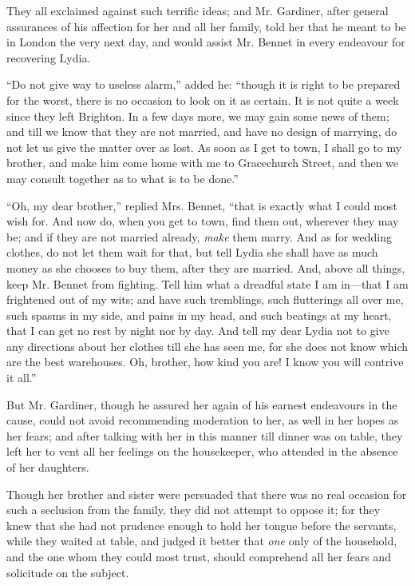 They all exclaimed against such terrific ideas; and Mr. Gardiner, after general assurances of his affection for her and all her family, told her that he meant to be in London the very next day, and would assist Mr. Bennet in every endeavour for recovering Lydia.

``Do not give way to useless alarm,'' added he: ``though it is right to be prepared for the worst, there is no occasion to look on it as certain. It is not quite a week since they left Brighton. In a few days more, we may gain some news of them; and till we know that they are not married, and have no design of marrying, do not let us give the matter over as lost. As soon as I get to town, I shall go to my brother, and make him come home with me to Gracechurch Street, and then we may consult together as to what is to be done.''

``Oh, my dear brother,'' replied Mrs. Bennet, ``that is exactly what I could most wish for. And now do, when you get to town, find them out, wherever they may be; and if they are not married already, \textit{make} them marry. And as for wedding clothes, do not let them wait for that, but tell Lydia she shall have as much money as she chooses to buy them, after they are married. And, above all things, keep Mr. Bennet from fighting. Tell him what a dreadful state I am in---that I am frightened out of my wits; and have such tremblings, such flutterings all over me, such spasms in my side, and pains in my head, and such beatings at my heart, that I can get no rest by night nor by day. And tell my dear Lydia not to give any directions about her clothes till she has seen me, for she does not know which are the best warehouses. Oh, brother, how kind you are! I know you will contrive it all.''

But Mr. Gardiner, though he assured her again of his earnest endeavours in the cause, could not avoid recommending moderation to her, as well in her hopes as her fears; and after talking with her in this manner till dinner was on table, they left her to vent all her feelings on the housekeeper, who attended in the absence of her daughters.

Though her brother and sister were persuaded that there was no real occasion for such a seclusion from the family, they did not attempt to oppose it; for they knew that she had not prudence enough to hold her tongue before the servants, while they waited at table, and judged it better that \textit{one} only of the household, and the one whom they could most trust, should comprehend all her fears and solicitude on the subject.

